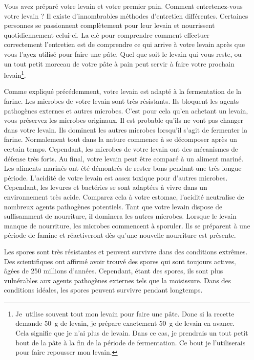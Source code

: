 Vous avez préparé votre levain et votre premier pain. Comment entretenez-vous votre levain ? Il existe d'innombrables méthodes d'entretien différentes. Certaines personnes se passionnent complètement pour leur levain et nourrissent quotidiennement celui-ci. La clé pour comprendre comment effectuer correctement l'entretien est de comprendre ce qui arrive à votre levain après que vous l'ayez utilisé pour faire une pâte. Quel que soit le levain qui vous reste, ou un tout petit morceau de votre pâte à pain peut servir à faire votre prochain levain\footnote{Je~utilise souvent tout mon levain pour faire une pâte. Donc si la recette demande \qty{50}{\gram} de levain, je prépare exactement \qty{50}{\gram} de levain en avance. Cela signifie que je n'ai plus de levain. Dans ce cas, je prendrais un tout petit bout de la pâte à la fin de la période de fermentation. Ce bout je l'utiliserais pour faire repousser mon levain.}.

Comme expliqué précédemment, votre levain est adapté à la fermentation de la farine. Les microbes de votre levain sont très résistants. Ils bloquent les agents pathogènes externes et autres microbes. C'est pour cela qu'en achetant un levain, vous préservez les microbes originaux. Il est probable qu'ils ne vont pas changer dans votre levain. Ils dominent les autres microbes lorsqu'il s'agit de fermenter la farine. Normalement tout dans la nature commence à se décomposer après un certain temps. Cependant, les microbes de votre levain ont des mécanismes de défense très forts. Au final, votre levain peut être comparé à un aliment mariné. Les aliments marinés ont été démontrés de rester bons pendant une très longue période\cite{pickled+foods+expiration}. L'acidité de votre levain est assez toxique pour d'autres microbes. Cependant, les levures et bactéries se sont adaptées à vivre dans un environnement très acide. Comparez cela à votre estomac, l'acidité neutralise de nombreux agents pathogènes potentiels. Tant que votre levain dispose de suffisamment de nourriture, il dominera les autres microbes. Lorsque le levain manque de nourriture, les microbes commencent à sporuler. Ils se préparent à une période de famine et réactiveront dès qu'une nouvelle nourriture est présente.

Les spores sont très résistantes et peuvent survivre dans des conditions extrêmes. Des scientifiques ont affirmé avoir trouvé des spores qui sont toujours actives, âgées de 250 millions d'années\cite{old+spores}. Cependant, étant des spores, ils sont plus vulnérables aux agents pathogènes externes tels que la moisissure. Dans des conditions idéales, les spores peuvent survivre pendant longtemps.

